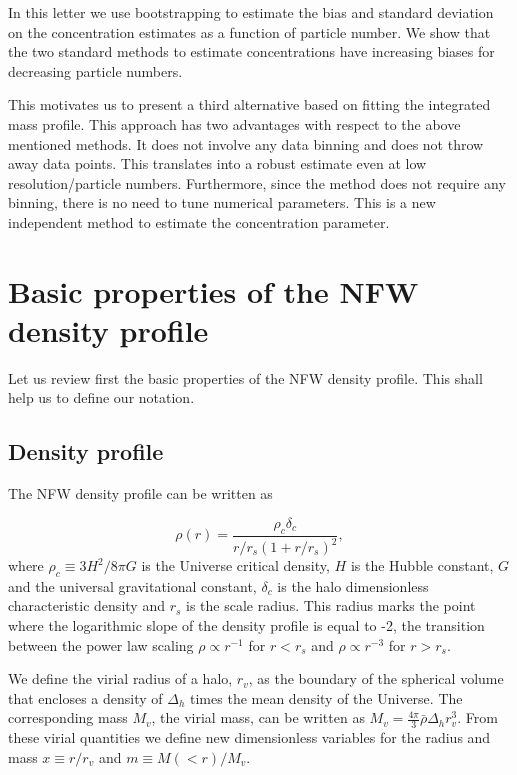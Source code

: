 \documentclass{emulateapj}
\begin{document}
In this letter we use bootstrapping to estimate the bias and standard
deviation on the concentration estimates as a function of particle
number. 
We show that the two standard methods to estimate concentrations have
increasing biases for decreasing particle numbers.  

This motivates us to present a third alternative based on fitting the
integrated mass profile.  
This approach has two advantages with respect to the above mentioned methods.  
It does not involve any data binning and does not throw away data points.  
This translates into a robust estimate even at low resolution/particle
numbers.   
Furthermore, since the method does not require any binning, there is no need to
tune numerical parameters.  
This is a new independent method to estimate the
concentration parameter.   


\section{Basic properties of the NFW density profile}
\label{sec:basics}

Let us review first the basic properties of the NFW density profile.
This shall help us to define our notation.

\subsection{Density profile}

The NFW density profile can be written as

\begin{equation}
\rho(r) = \frac{\rho_c\delta_c}{r/r_s(1+r/r_s)^2},
\label{eq:definition}
\end{equation}
%
where $\rho_c\equiv 3H^2/8\pi G$ is the Universe critical density, $H$
is the Hubble constant, $G$ and the universal gravitational constant,
$\delta_c$ is the halo dimensionless characteristic density and $r_s$
is the scale radius.  This radius marks the point where the
logarithmic slope of the density profile is equal to -2, the
transition between the power law scaling $\rho\propto r^{-1}$ for
$r<r_s$ and $\rho\propto r^{-3}$ for $r>r_s$.

We define the virial radius of a halo, $r_v$, as the boundary of the
spherical volume that encloses a density of $\Delta_h$ times the mean
density of the Universe.  The corresponding mass $M_{v}$, the virial
mass, can be written as $M_{v} = \frac{4\pi}{3}\bar{\rho}\Delta_h
r_v^3$.  From these virial quantities we define new dimensionless
variables for the radius and mass $x\equiv r/r_v$ and $m\equiv
M(<r)/M_v$.
\end{document}
